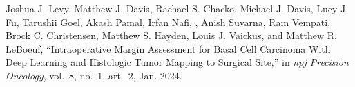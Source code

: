 \begin{pubSubsectionNum}
    \item Joshua J. Levy, Matthew J. Davis, Rachael S. Chacko, Michael J. Davis, Lucy J. Fu, Tarushii Goel, Akash Pamal, Irfan Nafi, \angrykoala, Anish Suvarna, Ram Vempati, Brock C. Christensen, Matthew S. Hayden, Louis J. Vaickus, and Matthew R. LeBoeuf, ``Intraoperative Margin Assessment for Basal Cell Carcinoma With Deep Learning and Histologic Tumor Mapping to Surgical Site,'' in \textit{npj Precision Oncology}, vol.~8, no.~1, art.~2, Jan. 2024.
\end{pubSubsectionNum}

